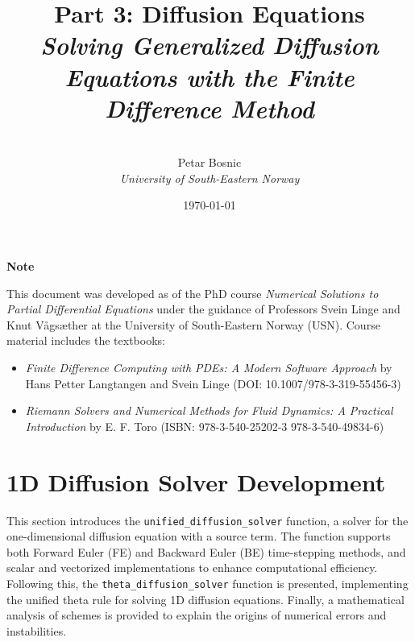 \documentclass{article}
\title{\textbf{Part 3: Diffusion Equations
	} \\[0.5em]  %
	\large \textit{Solving Generalized Diffusion Equations with the Finite Difference Method} \\[2em]  %
}
\author{\\[15em]  %
	Petar Bosnic \\[0.5em] %
	\textit{University of South-Eastern Norway} \\[2em]  %
}
\date{\today}
\begin{document}
	
	\maketitle
	\thispagestyle{empty}  %
	
	\vspace{1cm}
	
	\begin{center}
		\textbf{Note}
	\end{center}
	
	\noindent
	This document was developed as of the PhD course \textit{Numerical Solutions to Partial Differential Equations} under the guidance of Professors Svein Linge and Knut Vågsæther at the University of South-Eastern Norway (USN). Course material includes the textbooks:
	
	\begin{itemize}
		\item \textit{Finite Difference Computing with PDEs: A Modern Software Approach} by Hans Petter Langtangen and Svein Linge (DOI: 10.1007/978-3-319-55456-3)
		\item \textit{Riemann Solvers and Numerical Methods for Fluid Dynamics: A Practical Introduction} by E. F. Toro (ISBN: 978-3-540-25202-3 978-3-540-49834-6)
	\end{itemize}
	
	\vspace{1cm}
	
	\newpage  %
	
	\tableofcontents
	\newpage  %
	
	
	\section{1D Diffusion Solver Development}
	
		This section introduces the \texttt{unified\_diffusion\_solver} function, a solver for the one-dimensional diffusion equation with a source term. The function supports both Forward Euler (FE) and Backward Euler (BE) time-stepping methods, and scalar and vectorized implementations to enhance computational efficiency. Following this, the \texttt{theta\_diffusion\_solver} function is presented, implementing the unified theta rule for solving 1D diffusion equations. Finally, a mathematical analysis of  schemes is provided to explain the origins of numerical errors and instabilities.
		
\end{document}
